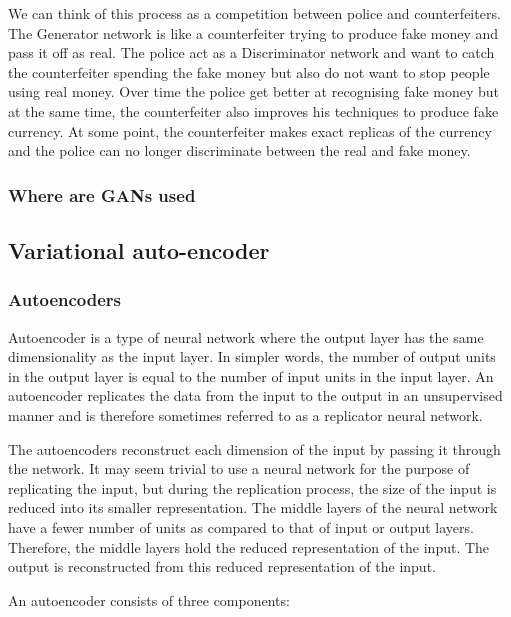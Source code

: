 We can think of this process as a competition between police and counterfeiters. The Generator network is like a counterfeiter trying to produce fake money and pass it off as real. The police act as a Discriminator network and want to catch the counterfeiter spending the fake money but also do not want to stop people using real money. Over time the police get better at recognising fake money but at the same time, the counterfeiter also improves his techniques to produce fake currency. At some point, the counterfeiter makes exact replicas of the currency and the police can no longer discriminate between the real and fake money.

\subsubsection{Where are GANs used}

\subsection{Variational auto-encoder}

\subsubsection{Autoencoders}

Autoencoder is a type of neural network where the output layer has the same dimensionality as the input layer. In simpler words, the number of output units in the output layer is equal to the number of input units in the input layer. An autoencoder replicates the data from the input to the output in an unsupervised manner and is therefore sometimes referred to as a replicator neural network.

The autoencoders reconstruct each dimension of the input by passing it through the network. It may seem trivial to use a neural network for the purpose of replicating the input, but during the replication process, the size of the input is reduced into its smaller representation. The middle layers of the neural network have a fewer number of units as compared to that of input or output layers. Therefore, the middle layers hold the reduced representation of the input. The output is reconstructed from this reduced representation of the input.

An autoencoder consists of three components:

